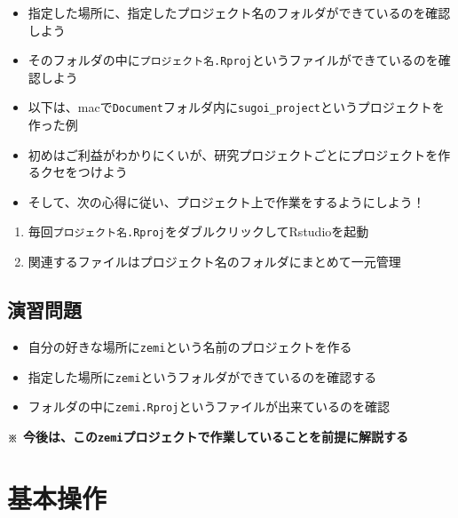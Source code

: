 \documentclass[
]{book}
\providecommand{\tightlist}{%
  \setlength{\itemsep}{0pt}\setlength{\parskip}{0pt}}
\begin{document}
\begin{itemize}
\tightlist
\item
  指定した場所に、指定したプロジェクト名のフォルダができているのを確認しよう
\item
  そのフォルダの中に\texttt{プロジェクト名.Rproj}というファイルができているのを確認しよう
\item
  以下は、macで\texttt{Document}フォルダ内に\texttt{sugoi\_project}というプロジェクトを作った例
\end{itemize}

\begin{itemize}
\tightlist
\item
  初めはご利益がわかりにくいが、研究プロジェクトごとにプロジェクトを作るクセをつけよう
\item
  そして、次の心得に従い、プロジェクト上で作業をするようにしよう！
\end{itemize}

\begin{enumerate}
\def\labelenumi{\arabic{enumi}.}
\tightlist
\item
  毎回\texttt{プロジェクト名.Rproj}をダブルクリックしてRstudioを起動
\item
  関連するファイルはプロジェクト名のフォルダにまとめて一元管理
\end{enumerate}

\hypertarget{ux6f14ux7fd2ux554fux984c}{%
\section{演習問題}\label{ux6f14ux7fd2ux554fux984c}}

\begin{itemize}
\tightlist
\item
  自分の好きな場所に\texttt{zemi}という名前のプロジェクトを作る
\item
  指定した場所に\texttt{zemi}というフォルダができているのを確認する
\item
  フォルダの中に\texttt{zemi.Rproj}というファイルが出来ているのを確認
\end{itemize}

\textbf{※ 今後は、この\texttt{zemi}プロジェクトで作業していることを前提に解説する}

\hypertarget{ux57faux672cux64cdux4f5c}{%
\chapter{基本操作}\label{ux57faux672cux64cdux4f5c}}
\end{document}
